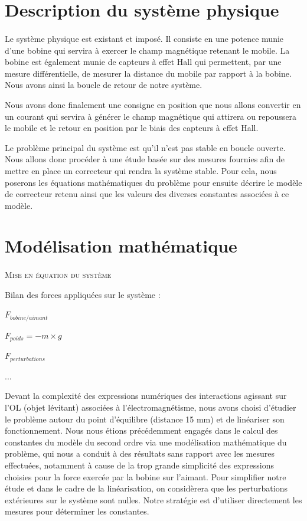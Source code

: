\documentclass[11pt, french]{article} %
\begin{document}
\section{Description du système physique}
\paragraph{}

Le système physique est existant et imposé. Il consiste en une potence munie d'une bobine qui servira à exercer le champ magnétique retenant le mobile. La bobine est également munie de capteurs à effet Hall qui permettent, par une mesure différentielle, de mesurer la distance du mobile par rapport à la bobine. Nous avons ainsi la boucle de retour de notre système. 

Nous avons donc finalement une consigne en position que nous allons convertir en un courant qui servira à générer le champ magnétique qui attirera ou repoussera le mobile et le retour en position par le biais des capteurs à effet Hall. 

Le problème principal du système est qu'il n'est pas stable en boucle ouverte. Nous allons donc procéder à une étude basée sur des mesures fournies afin de mettre en place un correcteur qui rendra la système stable. Pour cela, nous poserons les équations mathématiques du problème pour ensuite décrire le modèle de correcteur retenu ainsi que les valeurs des diverses constantes associées à ce modèle.

\section{Modélisation mathématique}

\paragraph{}
\textsc{Mise en équation du système}

\noindent
Bilan des forces appliquées sur le système :

\smallskip
$ F_{bobine/aimant}  $

$ F_{poids} = -m \times g $

$ F_{perturbations} $

...

\medskip

\noindent
Devant la complexité des expressions numériques des interactions agissant sur l'OL (objet lévitant) associées à l'électromagnétisme, nous avons choisi d'étudier le problème autour du point d'équilibre (distance 15 mm) et de linéariser son fonctionnement.
Nous nous étions précédemment engagés dans le calcul des constantes du modèle du second ordre via une modélisation mathématique du problème, qui nous a conduit à des résultats sans rapport avec les mesures effectuées, notamment à cause de la trop grande simplicité des expressions choisies pour la force exercée par la bobine sur l'aimant. Pour simplifier notre étude et dans le cadre de la linéarisation, on considèrera que les perturbations extérieures sur le système sont nulles. Notre stratégie est d'utiliser directement les mesures pour déterminer les constantes.
\end{document}
